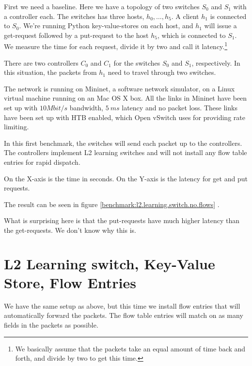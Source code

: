 First we need a baseline.  Here we have a topology
of two switches $S_0$ and $S_1$ with a controller each.  The switches has
three hosts, $h_0, \dots, h_5$.  A client $h_1$ is connected to $S_0$. We're
running Python key-value-stores on each host, and $h_1$ will issue a
get-request followed by a put-request to the host $h_5$, which is connected
to $S_1$.  We measure the time for each request, divide it by two and call
it latency.\footnote{We basically assume that the packets take an equal
  amount of time back and forth, and divide by two to get this time.}

There are two controllers $C_0$ and $C_1$ for the switches $S_0$ and $S_1$,
respectively.  In this situation, the packets from $h_1$ need to travel
through two switches.

The network is running on Mininet, a software network simulator, on a Linux
virtual machine running on an Mac OS X box.  All the links in Mininet have
been set up with $10 Mbit/s$ bandwidth, $5~ms$
latency  and no packet
loss.  These links have been set up with \ac{HTB} \cite{devera2002hierarchical} enabled, which Open vSwitch uses for providing rate limiting.

In this first benchmark, the switches will send each packet up to the
controllers.  The controllers implement L2 learning switches
and will not install any flow table entries for rapid dispatch.

On the X-axis is the time in seconds.  On the Y-axis is the
latency for get and put requests.

The result can be seen in figure \ref{benchmark:l2.learning.switch.no.flows} 
.

What is surprising here is that the put-requests have much higher latency
than the get-requests. We don't know why this is.

\section{L2 Learning switch, Key-Value Store, Flow Entries}

We have the same setup as above, but this time we install flow entries that
will automatically forward the packets.  The flow table entries will match
on as many fields in the packets as possible.

